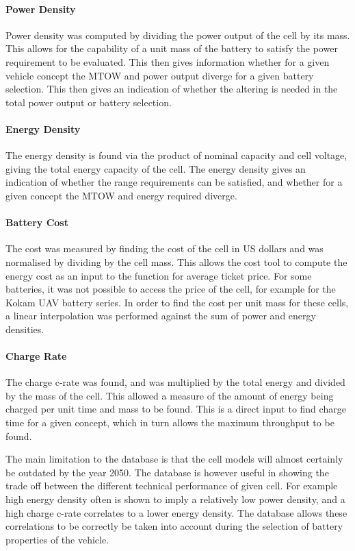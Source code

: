  \paragraph{Power Density} Power density was computed by dividing the power output of the cell by its mass. This allows for the capability of a unit mass of the battery to satisfy the power requirement to be evaluated. This then gives information whether for a given vehicle concept the MTOW and power output diverge for a given battery selection. This then gives an indication of whether the altering is needed in the total power output or battery selection. 
 \paragraph{Energy Density}  The energy density is found via the product of nominal capacity and cell voltage, giving the total energy capacity of the cell. The energy density gives an indication of whether the range requirements can be satisfied, and whether for a given concept the MTOW and energy required diverge.
 \paragraph{Battery Cost} The cost was measured by finding the cost of the cell in US dollars and was normalised by dividing by the cell mass. This allows the cost tool to compute the energy cost as an input to the function for average ticket price. For some batteries, it was not possible to access the price of the cell, for example for the Kokam UAV battery series. In order to find the cost per unit mass for these cells, a linear interpolation was performed against the sum of power and energy densities. 
 \paragraph{Charge Rate} The charge c-rate was found, and was multiplied by the total energy and divided by the mass of the cell. This allowed a measure of the amount of energy being charged per unit time and mass to be found. This is a direct input to find charge time for a given concept, which in turn allows the maximum throughput to be found.  

 The main limitation to the database is that the cell models will almost certainly be outdated by the year 2050. The database is however useful in showing the trade off between the different technical performance of given cell. For example high energy density often is shown to imply a relatively low power density, and a high charge c-rate correlates to a lower energy density. The database allows these correlations to be correctly be taken into account during the selection of battery properties of the vehicle. 





 



 
